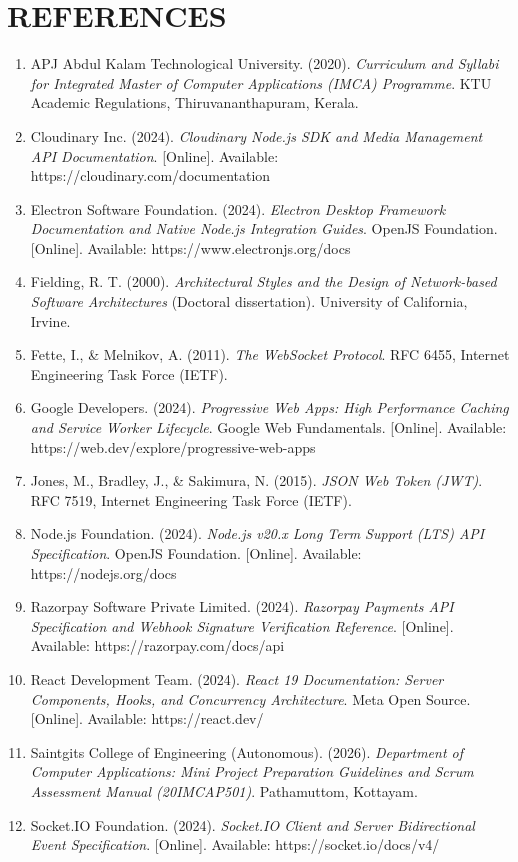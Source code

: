 \documentclass[12pt,a4paper]{report}
\begin{document}
\newpage
\chapter{REFERENCES}

\begin{enumerate}[leftmargin=0.35in, itemsep=8pt]
  \item APJ Abdul Kalam Technological University. (2020). \textit{Curriculum and Syllabi for Integrated Master of Computer Applications (IMCA) Programme}. KTU Academic Regulations, Thiruvananthapuram, Kerala.
  \item Cloudinary Inc. (2024). \textit{Cloudinary Node.js SDK and Media Management API Documentation}. [Online]. Available: https://cloudinary.com/documentation
  \item Electron Software Foundation. (2024). \textit{Electron Desktop Framework Documentation and Native Node.js Integration Guides}. OpenJS Foundation. [Online]. Available: https://www.electronjs.org/docs
  \item Fielding, R. T. (2000). \textit{Architectural Styles and the Design of Network-based Software Architectures} (Doctoral dissertation). University of California, Irvine.
  \item Fette, I., \& Melnikov, A. (2011). \textit{The WebSocket Protocol}. RFC 6455, Internet Engineering Task Force (IETF).
  \item Google Developers. (2024). \textit{Progressive Web Apps: High Performance Caching and Service Worker Lifecycle}. Google Web Fundamentals. [Online]. Available: https://web.dev/explore/progressive-web-apps
  \item Jones, M., Bradley, J., \& Sakimura, N. (2015). \textit{JSON Web Token (JWT)}. RFC 7519, Internet Engineering Task Force (IETF).
  \item Node.js Foundation. (2024). \textit{Node.js v20.x Long Term Support (LTS) API Specification}. OpenJS Foundation. [Online]. Available: https://nodejs.org/docs
  \item Razorpay Software Private Limited. (2024). \textit{Razorpay Payments API Specification and Webhook Signature Verification Reference}. [Online]. Available: https://razorpay.com/docs/api
  \item React Development Team. (2024). \textit{React 19 Documentation: Server Components, Hooks, and Concurrency Architecture}. Meta Open Source. [Online]. Available: https://react.dev/
  \item Saintgits College of Engineering (Autonomous). (2026). \textit{Department of Computer Applications: Mini Project Preparation Guidelines and Scrum Assessment Manual (20IMCAP501)}. Pathamuttom, Kottayam.
  \item Socket.IO Foundation. (2024). \textit{Socket.IO Client and Server Bidirectional Event Specification}. [Online]. Available: https://socket.io/docs/v4/
\end{enumerate}
\end{document}
